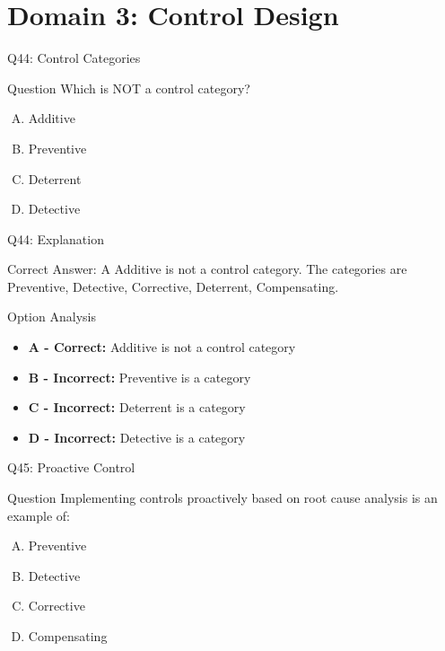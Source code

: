 \documentclass{beamer}
\begin{document}
	\section{Domain 3: Control Design}
	
	\begin{frame}{Q44: Control Categories}
		\begin{block}{Question}
			Which is NOT a control category?
		\end{block}
		\begin{enumerate}[(A)]
			\item Additive
			\item Preventive
			\item Deterrent
			\item Detective
		\end{enumerate}
	\end{frame}
	
	\begin{frame}{Q44: Explanation}
		\begin{block}{Correct Answer: A}
			Additive is not a control category. The categories are Preventive, Detective, Corrective, Deterrent, Compensating.
		\end{block}
		\begin{block}{Option Analysis}
			\begin{itemize}
				\item \textbf{A - Correct:} Additive is not a control category
				\item \textbf{B - Incorrect:} Preventive is a category
				\item \textbf{C - Incorrect:} Deterrent is a category
				\item \textbf{D - Incorrect:} Detective is a category
			\end{itemize}
		\end{block}
	\end{frame}
	
	\begin{frame}{Q45: Proactive Control}
		\begin{block}{Question}
			Implementing controls proactively based on root cause analysis is an example of:
		\end{block}
		\begin{enumerate}[(A)]
			\item Preventive
			\item Detective
			\item Corrective
			\item Compensating
		\end{enumerate}
	\end{frame}
	
\end{document}
